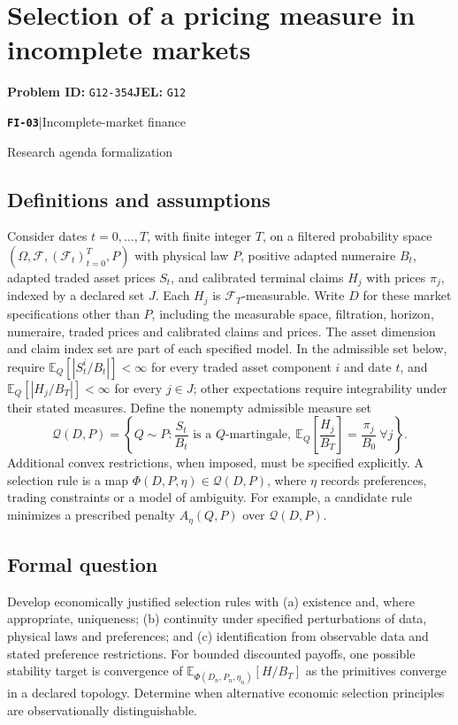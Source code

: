 \documentclass[11pt,a4paper]{article}
\newcommand{\E}{\mathbb E}
\newcommand{\entrymeta}[3]{{\sffamily\small\color{muted}\textbf{\texttt{#1}}\quad|\quad #2\par #3\par}}
\begin{document}
\section*{Selection of a pricing measure in incomplete markets}
\textbf{Problem ID:} \texttt{G12-354}\quad \textbf{JEL:} \texttt{G12}\par
\label{problem:OP-0580}
\label{beyond:FI-03}
\entrymeta{FI-03}{Incomplete-market finance}{Research agenda formalization}
\subsection*{Definitions and assumptions}
Consider dates $t=0,\ldots,T$, with finite integer $T$, on a filtered probability space $(\Omega,\mathcal F,(\mathcal F_t)_{t=0}^T,P)$ with physical law $P$, positive adapted numeraire $B_t$, adapted traded asset prices $S_t$, and calibrated terminal claims $H_j$ with prices $\pi_j$, indexed by a declared set $J$. Each $H_j$ is $\mathcal F_T$-measurable. Write $D$ for these market specifications other than $P$, including the measurable space, filtration, horizon, numeraire, traded prices and calibrated claims and prices. The asset dimension and claim index set are part of each specified model. In the admissible set below, require $\E_Q[|S_t^i/B_t|]<\infty$ for every traded asset component $i$ and date $t$, and $\E_Q[|H_j/B_T|]<\infty$ for every $j\in J$; other expectations require integrability under their stated measures. Define the nonempty admissible measure set
\[
 \mathcal Q(D,P)=\left\{Q\sim P:\frac{S_t}{B_t}\text{ is a }Q\text{-martingale},\
 \E_Q\!\left[\frac{H_j}{B_T}\right]=\frac{\pi_j}{B_0}\ \forall j\right\}.
\]
Additional convex restrictions, when imposed, must be specified explicitly. A selection rule is a map $\Phi(D,P,\eta)\in\mathcal Q(D,P)$, where $\eta$ records preferences, trading constraints or a model of ambiguity. For example, a candidate rule minimizes a prescribed penalty $A_\eta(Q,P)$ over $\mathcal Q(D,P)$.
\subsection*{Formal question}
Develop economically justified selection rules with (a) existence and, where appropriate, uniqueness; (b) continuity under specified perturbations of data, physical laws and preferences; and (c) identification from observable data and stated preference restrictions. For bounded discounted payoffs, one possible stability target is convergence of $\E_{\Phi(D_n,P_n,\eta_n)}[H/B_T]$ as the primitives converge in a declared topology. Determine when alternative economic selection principles are observationally distinguishable.
\end{document}
